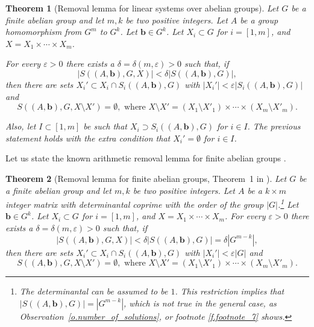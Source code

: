 \documentclass[10pt]{article}
\newtheorem{theorem}{Theorem}
\begin{document}
\begin{theorem}[Removal lemma for linear systems over abelian groups] \label{t.rem_lem_ab_gr}
	 Let $G$ be a finite abelian group and let $m, k$ be two positive integers. Let $A$ be a group homomorphism from $G^m$ to $G^k$.
	Let $\mathbf{b}\in G^k$. Let $X_i\subset G$ for $i=[1,m]$, and $X=X_1\times \cdots \times X_m$. 
	
	For every $\varepsilon>0$ there exists a $\delta=\delta(m,\varepsilon)>0$ such that, if
 $$\left|S((A,\mathbf{b}),G,X)\right|<\delta \left|S((A,\mathbf{b}),G)\right|,$$ then there are sets $X_i'\subset X_i\cap S_i((A,\mathbf{b}),G)$ with $|X_i'|<\varepsilon |S_i((A,\mathbf{b}),G)|$ and $$S\left((A,\mathbf{b}),G, X\setminus X'\right)=\emptyset, \text{ where } X\setminus X'=(X_1\setminus X'_1)\times \cdots \times (X_m\setminus X'_m).$$

Also, let $I\subset [1,m]$ be such that $X_i\supset S_i((A,\mathbf{b}),G)$ for $i\in I$. The previous statement holds with the extra condition that $X_i'=\emptyset$ for $i\in I$.
\end{theorem}

Let us state the known arithmetic removal lemma for finite abelian groups \cite[Theorem~1]{ksv13}.
\begin{theorem}[Removal lemma for finite abelian groups, Theorem~1 in \cite{ksv13}]\label{t.rem_lem_ksv13}
		 Let $G$ be a finite abelian group and let $m, k$ be two positive integers. Let $A$ be a $k\times m$ integer matrix with determinantal coprime with the order of the group $|G|$.\footnote{The determinantal can be assumed to be $1$. This restriction implies that $\left|S((A,\mathbf{b}),G)\right|= |G^{m-k}|$, which is not true in the general case, as Observation~\ref{o.number_of_solutions}, or footnote \ref{f.footnote_7} shows.}
		Let $\mathbf{b}\in G^k$. Let $X_i\subset G$ for $i=[1,m]$, and $X=X_1\times \cdots \times X_m$. For every $\varepsilon>0$ there exists a $\delta=\delta(m,\varepsilon)>0$ such that, if
	 $$\left|S((A,\mathbf{b}),G,X)\right|<\delta \left|S((A,\mathbf{b}),G)\right|=\delta |G^{m-k}|,$$ then there are sets $X_i'\subset X_i\cap S_i((A,\mathbf{b}),G)$ with $|X_i'|<\varepsilon |G|$ and $$S\left((A,\mathbf{b}),G, X\setminus X'\right)=\emptyset,
	\text{ where } X\setminus X'=(X_1\setminus X'_1)\times \cdots \times (X_m\setminus X'_m).$$
\end{theorem}
\end{document}
